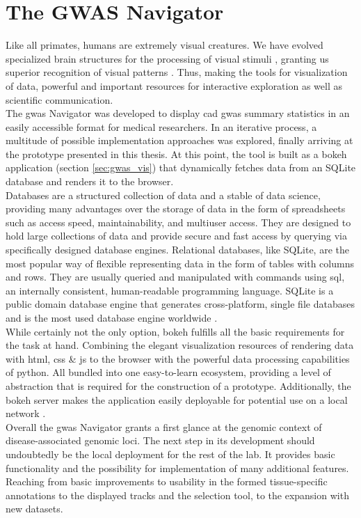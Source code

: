 \section{The GWAS Navigator}
Like all primates, humans are extremely visual creatures. We have evolved specialized brain structures for the processing of visual stimuli \cite{kaasCurrentResearchOrganization2014}, granting us superior recognition of visual patterns \cite{mattsonSuperiorPatternProcessing2014}. Thus, making the tools for visualization of data, powerful and important resources for interactive exploration as well as scientific communication.\\
The \ac{gwas} Navigator was developed to display \ac{cad} \ac{gwas} summary statistics in an easily accessible format for medical researchers. In an iterative process, a multitude of possible implementation approaches was explored, finally arriving at the prototype presented in this thesis. At this point, the tool is built as a bokeh application (section \ref{sec:gwas_vis}) that dynamically fetches data from an SQLite database and renders it to the browser.\\
Databases are a structured collection of data and a stable of data science, providing many advantages over the storage of data in the form of spreadsheets such as access speed, maintainability, and multiuser access. They are designed to hold large collections of data and provide secure and fast access by querying via specifically designed database engines. Relational databases, like SQLite, are the most popular way of flexible representing data in the form of tables with columns and rows. They are usually queried and manipulated with commands using \ac{sql}, an internally consistent, human-readable programming language. \cite{oraclecorporationWhatDatabase2022, oraclecorporationWhatRelationalDatabase2022} SQLite is a public domain database engine that generates cross-platform, single file databases and is the most used database engine worldwide \cite{thesqliteconsortiumSQLite2022}.\\
While certainly not the only option, bokeh fulfills all the basic requirements for the task at hand. Combining the elegant visualization resources of rendering data with \ac{html}, \ac{css} \& \ac{js} to the browser with the powerful data processing capabilities of python. All bundled into one easy-to-learn ecosystem, providing a level of abstraction that is required for the construction of a prototype. Additionally, the bokeh server makes the application easily deployable for potential use on a local network \cite{bokehdevelopmentteamBokehPythonLibrary2022}. \\
Overall the \ac{gwas} Navigator grants a first glance at the genomic context of disease-associated genomic loci. The next step in its development should undoubtedly be the local deployment for the rest of the lab. It provides basic functionality and the possibility for implementation of many additional features. Reaching from basic improvements to usability in the formed tissue-specific annotations to the displayed tracks and the selection tool, to the expansion with new datasets.


